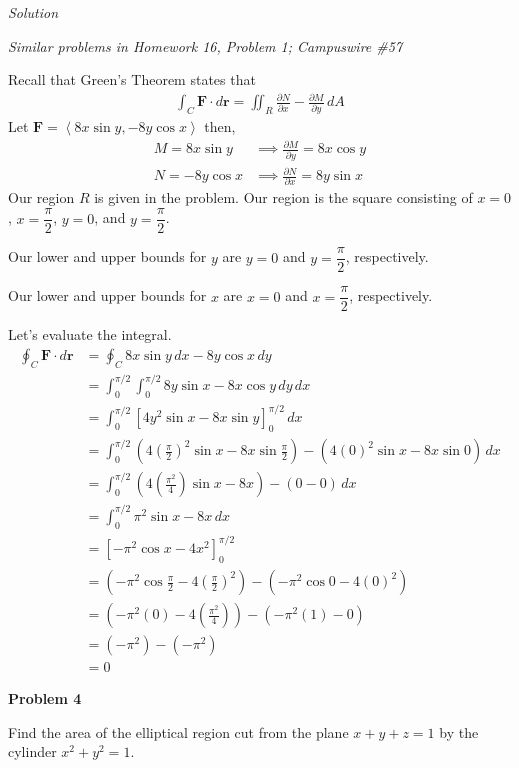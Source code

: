 \documentclass{article}
\newcommand{\lrp}[1]{\left( #1 \right)}
\newcommand{\lra}[1]{\left\langle #1 \right\rangle}
\newcommand{\lrb}[1]{\left[ #1 \right]}
\renewcommand{\r}[0]{\mathbf{r}}
\newcommand{\F}[0]{\mathbf{F}}
\newcommand{\Solution}{\textit{Solution}}
\begin{document}
\Solution

\textit{Similar problems in Homework 16, Problem 1; Campuswire \#57}

Recall that Green's Theorem states that
\begin{align*}
    \int_C \mathbf{F} \cdot d\mathbf{r} = \iint_R \frac{\partial N}{\partial x} - \frac{\partial M}{\partial y}\,dA
\end{align*}
Let $\F=\lra{8x\sin y, -8y\cos x}$ then,
\begin{align*}
 M=8x\sin y&\implies \frac{\partial M}{\partial y}=8x\cos y\\
  N=-8y\cos x&\implies  \frac{\partial N}{\partial x}= 8y \sin x
\end{align*}
Our region $R$ is given in the problem. Our region is the square consisting of $x=0$, $x=\dfrac{\pi}{2}$, $y=0$, and $y=\dfrac{\pi}{2}$.

Our lower and upper bounds for $y$ are $y=0$ and $y=\dfrac{\pi}{2}$, respectively.

Our lower and upper bounds for $x$ are $x=0$ and $x=\dfrac{\pi}{2}$, respectively.

Let's evaluate the integral.
\begin{align*}
    \oint_C \F\cdot d\r&=\oint_C 8x\sin y\,dx-8y\cos x\,dy\\
    &=\int_0^{\pi/2}\int_0^{\pi/2} 8y\sin x - 8x\cos y\,dy\,dx\\
    &=\int_0^{\pi/2}\lrb{4y^2\sin x - 8x\sin y}_0^{\pi/2}\,dx\\
    &=\int_0^{\pi/2}\lrp{4\lrp{\frac{\pi}{2}}^2\sin x-8x \sin\frac{\pi}{2}}-\lrp{4(0)^2\sin x - 8x\sin 0}\,dx\\
    &=\int_0^{\pi/2}\lrp{4\lrp{\frac{\pi^2}{4}}\sin x - 8x}-\lrp{0-0}\,dx\\
    &=\int_0^{\pi/2}\pi^2\sin x - 8x\,dx\\
    &=\lrb{-\pi^2 \cos x-4x^2}_0^{\pi/2}\\
    &=\lrp{-\pi^2 \cos \frac{\pi}{2}-4\lrp{\frac{\pi}{2}}^2}-\lrp{-\pi^2 \cos 0 -4(0)^2}\\
    &=\lrp{-\pi^2 (0)-4\lrp{\frac{\pi^2}{4}}}-\lrp{-\pi^2(1)-0}\\
    &=\lrp{-\pi^2}-\lrp{-\pi^2}\\
    &=\boxed{0}
\end{align*}
{}\textbf{Problem 4}

Find the area of the elliptical region cut from the plane $x+y+z=1$ by the cylinder $x^2+y^2=1$.
\end{document}
